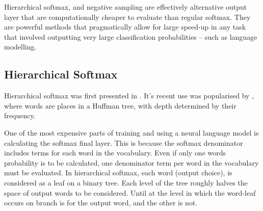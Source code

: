 \documentclass[parskip]{komatufte}
\begin{document}
Hierarchical softmax, and negative sampling are effectively alternative output layer that are computationally cheaper to evaluate than regular softmax.
They are powerful methods that pragmatically allow for large speed-up in any task that involved outputting very large classification probabilities -- such as language modelling.


\subsection{Hierarchical Softmax}\label{sec:hierarchical-softmax}
Hierarchical softmax was first presented in  .
It's recent use was popularised by , where words are places in a Huffman tree, with depth determined by their frequency.



One of the most expensive parts of training and using a neural language model is calculating the softmax final layer.
This is because the softmax denominator includes terms for each word in the vocabulary.
Even if only one words probability is to be calculated, one denominator term per word in the vocabulary must be evaluated.
In hierarchical softmax, each word (output choice), is considered as a leaf on a binary tree.
Each level of the tree roughly halves the space of output words to be considered.
Until at the level in which the word-leaf occurs on branch is for the output word, and the other is not.
\end{document}

